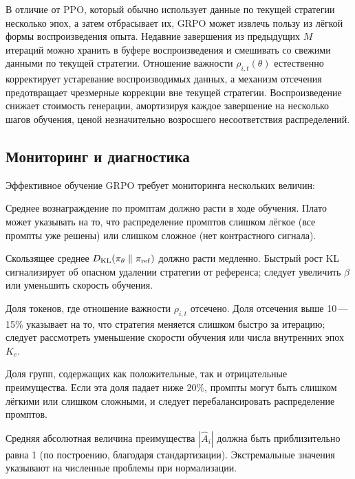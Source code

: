 В отличие от PPO, который обычно использует данные по текущей стратегии несколько эпох, а затем отбрасывает их, GRPO может извлечь пользу из лёгкой формы воспроизведения опыта. Недавние завершения из предыдущих $M$ итераций можно хранить в буфере воспроизведения и смешивать со свежими данными по текущей стратегии. Отношение важности $\rho_{i,t}(\theta)$ естественно корректирует устаревание воспроизводимых данных, а механизм отсечения предотвращает чрезмерные коррекции вне текущей стратегии. Воспроизведение снижает стоимость генерации, амортизируя каждое завершение на несколько шагов обучения, ценой незначительно возросшего несоответствия распределений.

\subsection{Мониторинг и диагностика}

Эффективное обучение GRPO требует мониторинга нескольких величин:
\begin{description}[leftmargin=!,labelwidth=3.5cm]
  \item[Кривая вознаграждения] Среднее вознаграждение по промптам должно расти в ходе обучения. Плато может указывать на то, что распределение промптов слишком лёгкое (все промпты уже решены) или слишком сложное (нет контрастного сигнала).
  \item[Дивергенция KL] Скользящее среднее $D_{\mathrm{KL}}\!\left(\pi_\theta\;\|\;\pi_\mathrm{ref}\right)$ должно расти медленно. Быстрый рост KL сигнализирует об опасном удалении стратегии от референса; следует увеличить $\beta$ или уменьшить скорость обучения.
  \item[Доля отсечения] Доля токенов, где отношение важности $\rho_{i,t}$ отсечено. Доля отсечения выше 10\,---\,15\% указывает на то, что стратегия меняется слишком быстро за итерацию; следует рассмотреть уменьшение скорости обучения или числа внутренних эпох $K_e$.
  \item[Разнообразие групп] Доля групп, содержащих как положительные, так и отрицательные преимущества. Если эта доля падает ниже 20\%, промпты могут быть слишком лёгкими или слишком сложными, и следует перебалансировать распределение промптов.
  \item[Величина преимущества] Средняя абсолютная величина преимущества $|\hat{A}_i|$ должна быть приблизительно равна 1 (по построению, благодаря стандартизации). Экстремальные значения указывают на численные проблемы при нормализации.
\end{description}

